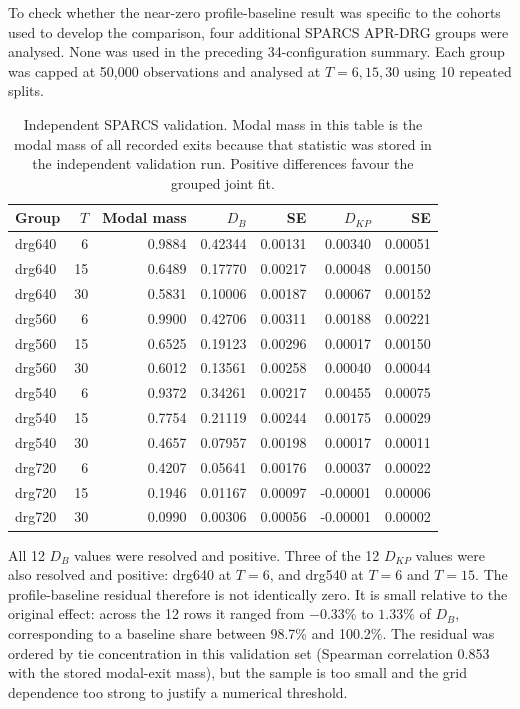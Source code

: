 \documentclass[smallextended,natbib]{svjour3}
\begin{document}
To check whether the near-zero profile-baseline result was specific to the cohorts used to develop the comparison, four additional SPARCS APR-DRG groups were analysed. None was used in the preceding 34-configuration summary. Each group was capped at 50,000 observations and analysed at $T=6,15,30$ using 10 repeated splits.

\begin{table}[!htbp]
\caption{Independent SPARCS validation. Modal mass in this table is the modal mass of all recorded exits because that statistic was stored in the independent validation run. Positive differences favour the grouped joint fit.}
\label{tab:heldout}
\centering
\scriptsize
\begin{tabular}{@{}lrrrrrr@{}}
\toprule
Group & $T$ & Modal mass & $D_B$ & SE & $D_{KP}$ & SE \\
\midrule
drg640 & 6  & 0.9884 & 0.42344 & 0.00131 & 0.00340 & 0.00051 \\
drg640 & 15 & 0.6489 & 0.17770 & 0.00217 & 0.00048 & 0.00150 \\
drg640 & 30 & 0.5831 & 0.10006 & 0.00187 & 0.00067 & 0.00152 \\
drg560 & 6  & 0.9900 & 0.42706 & 0.00311 & 0.00188 & 0.00221 \\
drg560 & 15 & 0.6525 & 0.19123 & 0.00296 & 0.00017 & 0.00150 \\
drg560 & 30 & 0.6012 & 0.13561 & 0.00258 & 0.00040 & 0.00044 \\
drg540 & 6  & 0.9372 & 0.34261 & 0.00217 & 0.00455 & 0.00075 \\
drg540 & 15 & 0.7754 & 0.21119 & 0.00244 & 0.00175 & 0.00029 \\
drg540 & 30 & 0.4657 & 0.07957 & 0.00198 & 0.00017 & 0.00011 \\
drg720 & 6  & 0.4207 & 0.05641 & 0.00176 & 0.00037 & 0.00022 \\
drg720 & 15 & 0.1946 & 0.01167 & 0.00097 & -0.00001 & 0.00006 \\
drg720 & 30 & 0.0990 & 0.00306 & 0.00056 & -0.00001 & 0.00002 \\
\bottomrule
\end{tabular}
\end{table}
\FloatBarrier

All 12 $D_B$ values were resolved and positive. Three of the 12 $D_{KP}$ values were also resolved and positive: drg640 at $T=6$, and drg540 at $T=6$ and $T=15$. The profile-baseline residual therefore is not identically zero. It is small relative to the original effect: across the 12 rows it ranged from $-0.33\%$ to $1.33\%$ of $D_B$, corresponding to a baseline share between 98.7\% and 100.2\%. The residual was ordered by tie concentration in this validation set (Spearman correlation 0.853 with the stored modal-exit mass), but the sample is too small and the grid dependence too strong to justify a numerical threshold.
\end{document}
